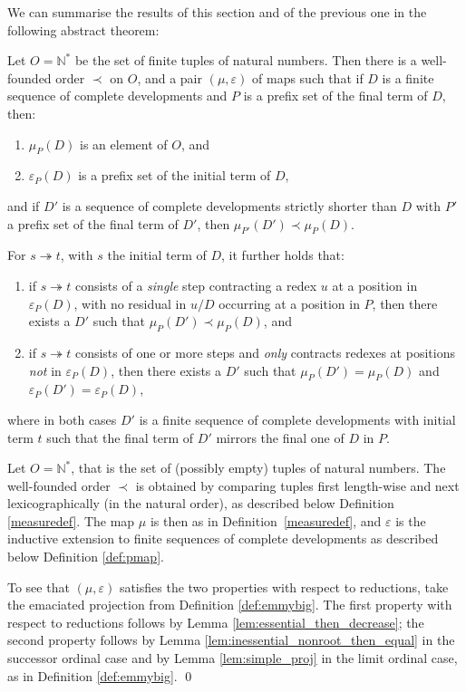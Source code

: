 \documentclass{LMCS}
\theoremstyle{definition}
\newcommand{\trewt}{\twoheadrightarrow}
\newcommand{\pmap}{\varepsilon}
\newcommand{\pmapp}[2]{\pmap_{#1}({#2})}
\newcommand{\pme}{\mu}
\newcommand{\pmep}[2]{\pme_{#1}({#2})}
\begin{document}
We can summarise the results of this section and of the previous one in the following abstract theorem:
\begin{thm}
Let $O = \mathbb{N}^*$ be the set of finite tuples of natural numbers. Then there is
a well-founded order $\prec$ on $O$, and a pair $(\pme, \pmap)$ of maps 
such that if $D$ is a finite sequence of complete developments and $P$ is a prefix set of the final term of $D$, then: 

\begin{enumerate}[$\bullet$]
\item
$\pmep{P}{D}$ is an element of $O$, and
\item
$\pmapp{P}{D}$ is a prefix set of the initial term of $D$,
\end{enumerate}
\noindent and if $D'$ is a sequence of complete developments strictly shorter than $D$ with $P'$ a prefix set of the final term of $D'$, then $\pmep{P'}{D'} \prec \pmep{P}{D}$.

For $s \trewt t$, with $s$ the initial term of $D$, it further holds that:
\begin{enumerate}[\em(1)]
\item
if $s \trewt t$ consists of a \emph{single} step contracting a redex $u$ at a position in $\pmapp{P}{D}$, with no residual in $u/D$ occurring at a position in $P$, then there exists a $D'$ such that $\pmep{P}{D'} \prec \pmep{P}{D}$, and
\item
if $s \trewt t$ consists of one or more steps and \emph{only} contracts redexes at positions \emph{not} in $\pmapp{P}{D}$, then there exists a $D'$ such that $\pmep{P}{D'} = \pmep{P}{D}$ and $\pmapp{P}{D'} = \pmapp{P}{D}$,
\end{enumerate}
where in both cases $D'$ is a finite sequence of complete developments with initial term $t$ such that the final term of $D'$ mirrors the final one of $D$ in $P$.
\end{thm}

\proof
Let $O = \mathbb{N}^*$, that is the set of (possibly empty) tuples of natural numbers.
The well-founded order $\prec$ is obtained by comparing tuples first length-wise and next lexicographically (in the natural order), as described below Definition \ref{measuredef}. The map $\pme$ is then as in Definition~\ref{measuredef}, and $\pmap$ is the inductive extension to finite sequences of complete developments as described below Definition \ref{def:pmap}.

To see that $(\pme, \pmap)$ satisfies the two properties with respect to reductions, take the emaciated projection from Definition \ref{def:emmybig}. The first property with respect to reductions follows by Lemma \ref{lem:essential_then_decrease}; the second property follows by Lemma \ref{lem:inessential_nonroot_then_equal} in the successor ordinal case and by Lemma \ref{lem:simple_proj} in the limit ordinal case, as in Definition \ref{def:emmybig}.
\qed
\end{document}
